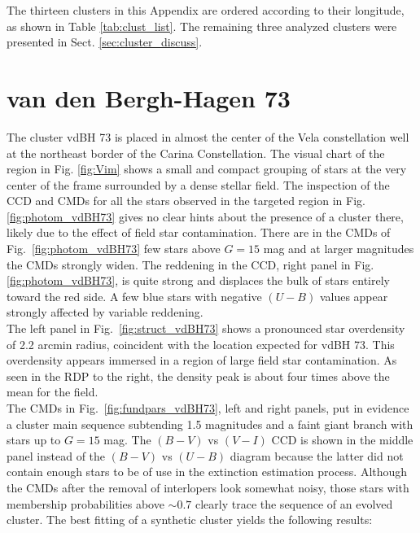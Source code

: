 \documentclass[draft]{aa}
\begin{document}
\appendix

The thirteen clusters in this Appendix are ordered according to their
longitude, as shown in Table \ref{tab:clust_list}. The remaining three
analyzed clusters were presented in Sect. \ref{sec:cluster_discuss}.


\section{van den Bergh-Hagen 73}

The cluster vdBH 73 is placed in almost the center of the Vela
constellation well at the northeast border of the Carina Constellation. The
visual chart of the region in Fig. \ref{fig:Vim} shows a small and compact
grouping of stars at the very center of the frame surrounded by a dense stellar
field.
The inspection of the CCD and CMDs for all the stars observed
in the targeted region in Fig. \ref{fig:photom_vdBH73} gives no clear
hints about the presence of a cluster there, likely due to the
effect of field star contamination.
There are in the CMDs of Fig.~\ref{fig:photom_vdBH73} few stars above $G=15$
mag and at larger magnitudes the CMDs strongly widen.
The reddening in the CCD, right panel in Fig. \ref{fig:photom_vdBH73}, is quite
strong and displaces the bulk of stars entirely toward the red side. A
few blue stars with negative $(U-B)$ values appear strongly affected by
variable reddening.\\

The left panel in Fig.~\ref{fig:struct_vdBH73} shows a pronounced star
overdensity of 2.2 arcmin radius, coincident with the location expected for
vdBH 73. This overdensity appears immersed in a region of large field
star contamination. As seen in the RDP to the right, the density peak is about
four times above the mean for the field.\\

The CMDs in Fig.~\ref{fig:fundpars_vdBH73}, left and right panels, put in
evidence a cluster main sequence subtending 1.5 magnitudes and a faint giant
branch with stars up to $G=15$ mag.
The $(B-V)$ vs $(V-I)$ CCD is shown in the middle panel instead of the
$(B-V)$ vs $(U-B)$ diagram because the latter did not contain enough stars to
be of use in the extinction estimation process.
Although the CMDs after the removal of interlopers look somewhat noisy,
those stars with membership probabilities above $\sim0.7$ clearly
trace the sequence of an evolved cluster.
%
The best fitting of a synthetic cluster yields the following results:
\end{document}
